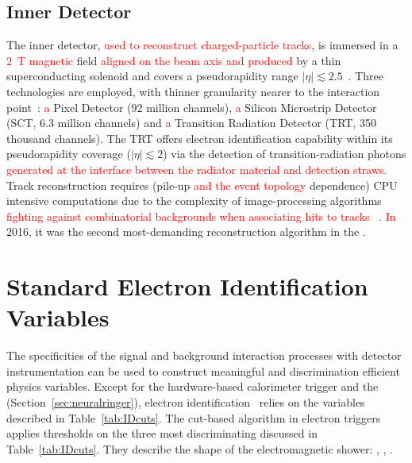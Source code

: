\subsection{Inner Detector}\label{ssec:track}

The inner detector, \textcolor{red}{used to reconstruct charged-particle tracks}, is immersed in a
\textcolor{red}{\SI{2}{\tesla} magnetic} field \textcolor{red}{aligned on the beam axis and produced} by a thin superconducting solenoid
and covers a pseudorapidity range $|\eta| \lesssim 2.5$~\cite{PERF-2007-01}.
Three technologies are employed, with thinner granularity nearer to the
interaction point~\cite{PERF-2015-08,inner_tdr1,inner_tdr2}: \textcolor{red}{a} Pixel Detector (92
million channels), \textcolor{red}{a} Silicon Microstrip Detector (SCT, 6.3 million channels) and
\textcolor{red}{a} Transition Radiation Detector (TRT, 350 thousand channels). The TRT offers
electron identification capability within its pseudorapidity coverage ($|\eta|
\lesssim 2$) via the detection of transition-radiation photons \textcolor{red}{generated at the interface between the radiator material and detection straws.} Track reconstruction requires (pile-up \textcolor{red}{and the event topology} dependence) CPU intensive
computations due to the complexity of image-processing algorithms \textcolor{red}{fighting against combinatorial backgrounds when associating hits to tracks ~\cite{PERF-2015-08}. In} 2016, it was the second
most-demanding reconstruction algorithm in the \hlt{}.






\section{Standard Electron Identification Variables}\label{ssec:std_variables}

The specificities of the signal and background interaction processes with
detector instrumentation can be used to construct meaningful and discrimination
efficient physics variables. Except for the hardware-based calorimeter trigger
and the \rnn (Section~\ref{sec:neuralringer}), electron
identification~\cite{atlas_electron_id_offline} relies on the variables
described in Table~\ref{tab:IDcuts}. 
The cut-based algorithm in electron
triggers applies thresholds on the three most discriminating discussed in Table~\ref{tab:IDcuts}. They describe the shape of the electromagnetic shower: \reta{}, \eratio{}, \rhadone{}.


